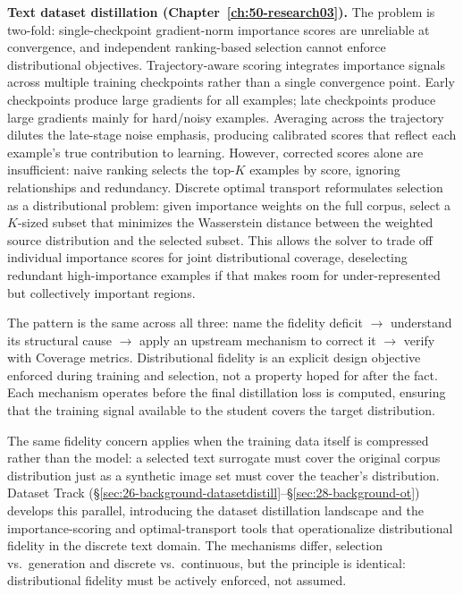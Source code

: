 \begin{foldable}
  \textbf{Text dataset distillation (Chapter~\ref{ch:50-research03}).}
  The problem is two-fold: single-checkpoint gradient-norm importance scores are unreliable at convergence, and independent ranking-based selection cannot enforce distributional objectives.
  Trajectory-aware scoring integrates importance signals across multiple training checkpoints rather than a single convergence point.
  Early checkpoints produce large gradients for all examples; late checkpoints produce large gradients mainly for hard/noisy examples.
  Averaging across the trajectory dilutes the late-stage noise emphasis, producing calibrated scores that reflect each example's true contribution to learning.
  However, corrected scores alone are insufficient: naive ranking selects the top-$K$ examples by score, ignoring relationships and redundancy.
  Discrete optimal transport reformulates selection as a distributional problem: given importance weights on the full corpus, select a $K$-sized subset that minimizes the Wasserstein distance between the weighted source distribution and the selected subset.
  This allows the solver to trade off individual importance scores for joint distributional coverage, deselecting redundant high-importance examples if that makes room for under-represented but collectively important regions.
\end{foldable}

\begin{foldable}
  The pattern is the same across all three: name the fidelity deficit $\to$ understand its structural cause $\to$ apply an upstream mechanism to correct it $\to$ verify with Coverage metrics.
  Distributional fidelity is an explicit design objective enforced during training and selection, not a property hoped for after the fact.
  Each mechanism operates before the final distillation loss is computed, ensuring that the training signal available to the student covers the target distribution.
\end{foldable}

\begin{foldable}
  The same fidelity concern applies when the training data itself is compressed rather than the model: a selected text surrogate must cover the original corpus distribution just as a synthetic image set must cover the teacher's distribution.
  Dataset Track (\S\ref{sec:26-background-datasetdistill}--\S\ref{sec:28-background-ot}) develops this parallel, introducing the dataset distillation landscape and the importance-scoring and optimal-transport tools that operationalize distributional fidelity in the discrete text domain.
  The mechanisms differ, selection vs.\ generation and discrete vs.\ continuous, but the principle is identical: distributional fidelity must be actively enforced, not assumed.
\end{foldable}
